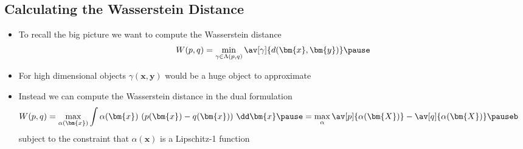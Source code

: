 \begin{slide}
\section[-2]{Calculating the Wasserstein Distance}

\begin{PauseHighLight}
  \begin{itemize}
  \item To recall the big picture we want to compute the Wasserstein
    distance
    \begin{align*}
       W(p,q) = \min_{\gamma \in \Lambda(p,q)}
      \av[\gamma]{d(\bm{x},\bm{y})}\pause
    \end{align*}
  \item For high dimensional objects $\gamma(\bm{x},\bm{y})$ would be
    a huge object to approximate\pause
  \item Instead we can compute the Wasserstein distance in the dual
    formulation
    \begin{align*}
      \hspace*{-1em}W(p,q) = \max_{\alpha(\bm{x})} \int \alpha(\bm{x})\,\left(p(\bm{x}) -
      q(\bm{x})\right) \, \dd \bm{x} \pause
      = \max_{\alpha} \av[p]{\alpha(\bm{X})} - \av[q]{\alpha(\bm{X})}\pauseb
    \end{align*}
    subject to the constraint that $\alpha(\bm{x})$ is a Lipschitz-1
    function\pause
  \end{itemize}
\end{PauseHighLight}

\end{slide}


\Outline %

